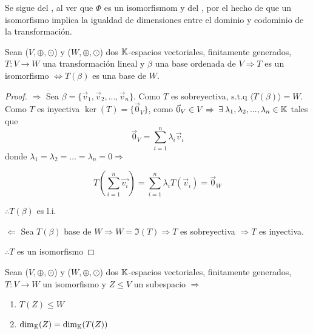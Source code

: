 \begin{orangeproof}
    Se sigue del , al ver que $\Phi$ es un isomorfismom y del  , por el hecho de que un isomorfismo implica la igualdad de dimensiones entre el dominio y codominio de la transformación. 
\end{orangeproof}

\begin{theorem}
    Sean ($V, \oplus, \odot$) y ($W, \oplus, \odot$) dos $\mathbb{K}$-espacios vectoriales, finitamente generados, $T: V \to W$ una transformación lineal y $\beta$ una base ordenada de $V \Rightarrow T$ es un isomorfismo $\iff  T(\beta)$ es una base de $W$.
\end{theorem}

\begin{proof}
    $\Rightarrow$ Sea $\beta = \{\vec{v}_1,\vec{v}_2,...,\vec{v}_n\}$. Como $T$ es sobreyectiva, s.t.q $\langle T(\beta) \rangle = W$. Como $T$ es inyectiva $\ker(T)=\{\vec{0}_V\}$, como $\vec{0}_V \in V \Rightarrow \: \exists \: \lambda_1,\lambda_2,...,\lambda_n \in \mathbb{K}$ tales que
    $$\vec{0}_V=\sum_{i=1}^n \lambda_i \vec{v}_i$$ 
    donde $\lambda_1=\lambda_2=...=\lambda_n=0 \Rightarrow$

    $$T\left(\sum_{i=1}^n \vec{v_i}\right)=\sum_{i=1}^n \lambda_i T(\vec{v}_i)=\vec{0}_W$$
    
    $\therefore T(\beta)$ es l.i.
    
    $\Leftarrow$ Sea $T(\beta)$ base de $W \Rightarrow W=\Im(T) \Rightarrow T$ es sobreyectiva $\Rightarrow T$ es inyectiva. 
    
    $\therefore T$ es un isomorfismo
\end{proof}

\begin{theorem} \label{tareatheom6}
    Sean ($V, \oplus, \odot$) y ($W, \oplus, \odot$) dos $\mathbb{K}$-espacios vectoriales, finitamente generados, $T:V \to W$ un isomorfismo y $Z \leq V $ un subespacio $ \Rightarrow$
    \begin{enumerate}
        \item $T(Z) \leq W$
        \item $\dim_{\mathbb{K}}(Z)=\dim_{\mathbb{K}}(T(Z))$
    \end{enumerate} 
\end{theorem}

